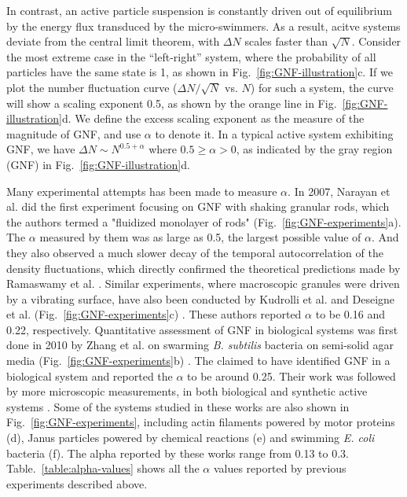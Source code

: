 In contrast, an active particle suspension is constantly driven out of equilibrium by the energy flux transduced by the micro-swimmers.
As a result, acitve systems deviate from the central limit theorem, with $\Delta N$ scales faster than $\sqrt N$.
Consider the most extreme case in the ``left-right'' system, where the probability of all particles have the same state is 1, as shown in Fig.~\ref{fig:GNF-illustration}c.
If we plot the number fluctuation curve ($\Delta N/\sqrt N$ vs. $N$) for such a system, the curve will show a scaling exponent 0.5, as shown by the orange line in Fig.~\ref{fig:GNF-illustration}d.
We define the excess scaling exponent as the measure of the magnitude of GNF, and use $\alpha$ to denote it.
In a typical active system exhibiting GNF, we have $\Delta N \sim N^{0.5+\alpha}$ where $0.5\ge\alpha>0$, as indicated by the gray region (GNF) in Fig.~\ref{fig:GNF-illustration}d.

Many experimental attempts has been made to measure $\alpha$. In 2007, Narayan et al. did the first experiment focusing on GNF with shaking granular rods, which the authors termed a "fluidized monolayer of rods" (Fig.~\ref{fig:GNF-experiments}a)\cite{Narayan2007}. The $\alpha$ measured by them was as large as 0.5, the largest possible value of $\alpha$. And they also observed a much slower decay of the temporal autocorrelation of the density fluctuations, which directly confirmed the theoretical predictions made by Ramaswamy et al. \cite{Ramaswamy2003}.
Similar experiments, where macroscopic granules were driven by a vibrating surface, have also been conducted by Kudrolli et al. \cite{Kudrolli2008} and Deseigne et al. (Fig.~\ref{fig:GNF-experiments}c) \cite{Deseigne2010}. These authors reported $\alpha$ to be 0.16 and 0.22, respectively.
Quantitative assessment of GNF in biological systems was first done in 2010 by Zhang et al. on swarming \textit{B. subtilis} bacteria on semi-solid agar media (Fig.~\ref{fig:GNF-experiments}b) \cite{Zhang2010}.
The claimed to have identified GNF in a biological system and reported the $\alpha$ to be around 0.25.
Their work was followed by more microscopic measurements, in both biological and synthetic active systems \cite{Schaller2013, Palacci2013, Kawaguchi2017, Nishiguchi2017, Karani2019}.
Some of the systems studied in these works are also shown in Fig.~\ref{fig:GNF-experiments}, including actin filaments powered by motor proteins (d), Janus particles powered by chemical reactions (e) and swimming \textit{E. coli} bacteria (f).
The alpha reported by these works range from 0.13 to 0.3.
Table.~\ref{table:alpha-values} shows all the $\alpha$ values reported by previous experiments described above.


